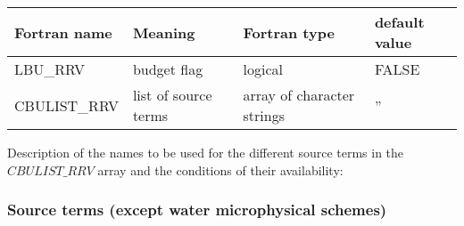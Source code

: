 \begin{longtable} {|p{}|p{}|>{\centering}p{}|p{}<{\centering}|}
\hline
Fortran name & Meaning & Fortran type & default value \\
\hline \hline
\endhead
LBU\_RRV & budget flag & logical & FALSE\index{LBU\_RRV!\innam{NAM\_BU\_RRV}} \\\hline
CBULIST\_RRV & list of source terms & array of character strings & ''\index{CBULIST\_RRV!\innam{NAM\_BU\_RRV}} \\\hline
\end{longtable}

Description of the names to be used for the different source terms in the $CBULIST\_RRV$ array and the conditions of their availability:

\subsubsection{Source terms (except water microphysical schemes)}

